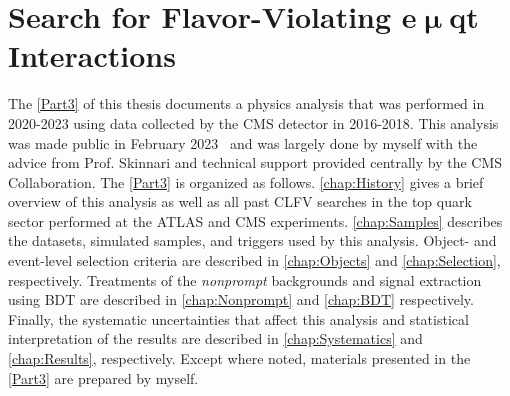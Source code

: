 \part{Search for Flavor-Violating e$\bm{\upmu}$qt Interactions}
\label{Part3}
The \autoref{Part3} of this thesis documents a physics analysis that was performed in 2020-2023 using data collected by the \ac{CMS} detector in 2016-2018. This analysis was made public in February 2023~\cite{CMS:2023phe} and was largely done by myself with the advice from Prof. Skinnari and technical support provided centrally by the \ac{CMS} Collaboration. The \autoref{Part3} is organized as follows. \autoref{chap:History} gives a brief overview of this analysis as well as all past \ac{CLFV} searches in the top quark sector performed at the \ac{ATLAS} and \ac{CMS} experiments. \autoref{chap:Samples} describes the datasets, simulated samples, and triggers used by this analysis. Object- and event-level selection criteria are described in \autoref{chap:Objects} and \autoref{chap:Selection}, respectively. Treatments of the \emph{nonprompt} backgrounds and signal extraction using \ac{BDT} are described in \autoref{chap:Nonprompt} and \autoref{chap:BDT} respectively. Finally, the systematic uncertainties that affect this analysis and statistical interpretation of the results are described in \autoref{chap:Systematics} and \autoref{chap:Results}, respectively. Except where noted, materials presented in the \autoref{Part3} are prepared by myself.









